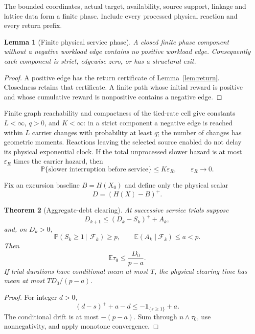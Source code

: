 \documentclass[11pt]{article}
\newtheorem{theorem}{Theorem}[section]
\newtheorem{lemma}[theorem]{Lemma}
\newcommand{\E}{\mathbb E}
\newcommand{\Pp}{\mathbb P}
\newcommand{\one}{\mathbf 1}
\begin{document}
The bounded coordinates, actual target, availability, source support,
linkage and lattice data form a finite phase.  Include every processed
physical reaction and every return prefix.

\begin{lemma}[Finite physical service phase]\label{lem:phase}
A closed finite phase component without a negative workload edge contains no
positive workload edge.  Consequently each component is strict, edgewise
zero, or has a structural exit.
\end{lemma}

\begin{proof}
A positive edge has the return certificate of Lemma~\ref{lem:return}.
Closedness retains that certificate.  A finite path whose initial reward is
positive and whose cumulative reward is nonpositive contains a negative edge.
\end{proof}

Finite graph reachability and compactness of the tied-rate cell give constants
\(L<\infty\), \(q>0\), and \(K<\infty\): in a strict component a negative
edge is reached within \(L\) carrier changes with probability at least \(q\);
the number of changes has geometric moments.  Reactions leaving the selected
source enabled do not delay its physical exponential clock.  If the total
unprocessed slower hazard is at most \(\varepsilon_R\) times the carrier
hazard, then
\[
 \Pp\{\text{slower interruption before service}\}\le K\varepsilon_R,
 \qquad \varepsilon_R\to0.                    \tag{4.2}
\]

Fix an excursion baseline \(B=H(X_0)\) and define only the physical scalar
\[
 D=(H(X)-B)^+.
\]

\begin{theorem}[Aggregate-debt clearing]\label{thm:debt}
At successive service trials suppose
\[
 D_{k+1}\le(D_k-S_k)^++A_k,
\]
and, on \(D_k>0\),
\[
 \Pp(S_k\ge1\mid\mathcal F_k)\ge p,\qquad
 \E(A_k\mid\mathcal F_k)\le a<p.
\]
Then
\[
 \E\tau_0\le \frac{D_0}{p-a}.
\]
If trial durations have conditional mean at most \(T\), the physical clearing
time has mean at most \(TD_0/(p-a)\).
\end{theorem}

\begin{proof}
For integer \(d>0\),
\[
 (d-s)^++a-d\le-\one_{\{s\ge1\}}+a.
\]
The conditional drift is at most \(-(p-a)\).  Sum through
\(n\wedge\tau_0\), use nonnegativity, and apply monotone convergence.
\end{proof}
\end{document}
